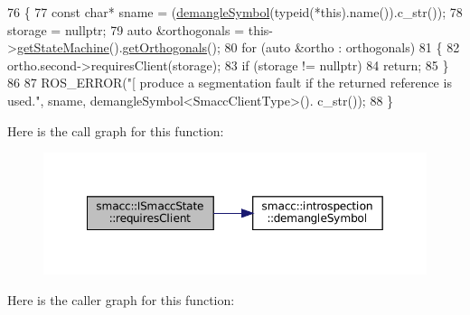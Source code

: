 \begin{DoxyCode}
76 \{
77     \textcolor{keyword}{const} \textcolor{keywordtype}{char}* sname = (\hyperlink{namespacesmacc_1_1introspection_a2f495108db3e57604d8d3ff5ef030302}{demangleSymbol}(\textcolor{keyword}{typeid}(*this).name()).c\_str());
78     storage = \textcolor{keyword}{nullptr};
79     \textcolor{keyword}{auto} &orthogonals = this->\hyperlink{classsmacc_1_1ISmaccState_a562bb3f9a3ac16b8be71e4794c9e7523}{getStateMachine}().\hyperlink{classsmacc_1_1ISmaccStateMachine_a7f5b2882dbd077584767cb2533ed3c49}{getOrthogonals}();
80     \textcolor{keywordflow}{for} (\textcolor{keyword}{auto} &ortho : orthogonals)
81     \{
82         ortho.second->requiresClient(storage);
83         \textcolor{keywordflow}{if} (storage != \textcolor{keyword}{nullptr})
84             \textcolor{keywordflow}{return};
85     \}
86 
87     ROS\_ERROR(\textcolor{stringliteral}{"[%
       produce a segmentation fault if the returned reference is used."}, sname, demangleSymbol<SmaccClientType>().
      c\_str());
88 \}
\end{DoxyCode}
Here is the call graph for this function\+:
\nopagebreak
\begin{figure}[H]
\begin{center}
\leavevmode
\includegraphics[width=349pt]{classsmacc_1_1ISmaccState_a7f95c9f0a6ea2d6f18d1aec0519de4ac_cgraph}
\end{center}
\end{figure}
Here is the caller graph for this function\+:
\nopagebreak
